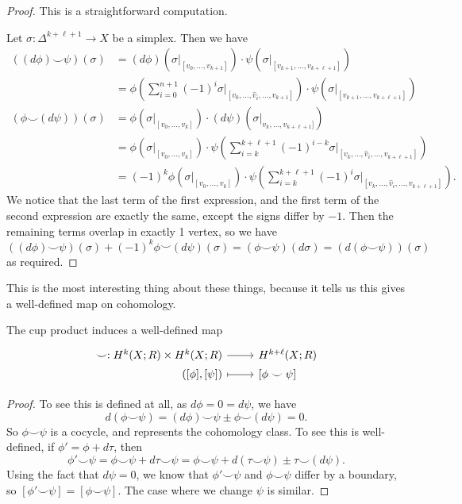 \documentclass[a4paper]{article}
\begin{document}
\begin{proof}
  This is a straightforward computation.

  Let $\sigma: \Delta^{k + \ell + 1} \to X$ be a simplex. Then we have
  \begin{align*}
    ((d \phi)\smile \psi)(\sigma) &= (d \phi)(\sigma|_{[v_0, \ldots, v_{k + 1}]}) \cdot \psi(\sigma|_{[v_{k + 1}, \ldots, v_{k + \ell + 1}]})\\
    &= \phi\left(\sum_{i = 0}^{n + 1} (-1)^i \sigma|_{[v_0, \ldots, \hat{v}_i, \ldots, v_{k + 1}]}\right) \cdot \psi(\sigma|_{[v_{k + 1}, \ldots, v_{k + \ell + 1}]})\\
    (\phi \smile (d \psi))(\sigma) &= \phi(\sigma|_{[v_0, \ldots, v_k]}) \cdot (d \psi)(\sigma|_{v_k,\ldots, v_{k + \ell + 1}]})\\
    &=\phi(\sigma|_{[v_0, \ldots, v_k]}) \cdot \psi\left(\sum_{i = k}^{k + \ell + 1} (-1)^{i - k} \sigma|_{[v_k, \ldots, \hat{v}_i, \ldots, v_{k + \ell + 1}]}\right)\\
    &=(-1)^k \phi(\sigma|_{[v_0, \ldots, v_k]}) \cdot \psi\left(\sum_{i = k}^{k + \ell + 1} (-1)^{i} \sigma|_{[v_k, \ldots, \hat{v}_i, \ldots, v_{k + \ell + 1}]}\right).
  \end{align*}
  We notice that the last term of the first expression, and the first term of the second expression are exactly the same, except the signs differ by $-1$. Then the remaining terms overlap in exactly 1 vertex, so we have
  \[
    ((d \phi) \smile \psi)(\sigma) + (-1)^k \phi \smile (d \psi)(\sigma) = (\phi \smile \psi)(d \sigma) = (d (\phi \smile \psi))(\sigma)
  \]
  as required.
\end{proof}
This is the most interesting thing about these things, because it tells us this gives a well-defined map on cohomology.

\begin{cor}
  The cup product induces a well-defined map
  \[
    \begin{tikzcd}[row sep = 0ex
        ,/tikz/column 1/.append style={anchor=base east}
        ,/tikz/column 2/.append style={anchor=base west}
      ]
      \smile: H^k(X; R) \times H^k(X; R) \ar[r] & H^{k + \ell}(X; R)\\
      ([\phi], [\psi] ) \ar[r, maps to] & \lbrack\phi \smile \psi\rbrack
    \end{tikzcd}
  \]
\end{cor}

\begin{proof}
  To see this is defined at all, as $d \phi = 0 = d \psi$, we have
  \[
    d (\phi \smile \psi) = (d \phi) \smile \psi \pm \phi \smile (d \psi) = 0.
  \]
  So $\phi \smile \psi$ is a cocycle, and represents the cohomology class. To see this is well-defined, if $\phi' = \phi + d\tau$, then
  \[
    \phi' \smile \psi = \phi \smile \psi + d \tau \smile \psi = \phi \smile \psi + d(\tau \smile \psi) \pm \tau \smile (d \psi).
  \]
  Using the fact that $d \psi = 0$, we know that $\phi' \smile \psi$ and $\phi \smile \psi$ differ by a boundary, so $[\phi' \smile \psi] = [\phi \smile \psi]$. The case where we change $\psi$ is similar.
\end{proof}
\end{document}
